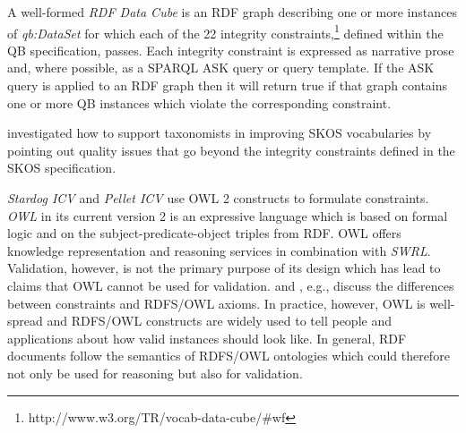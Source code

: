\documentclass[conference]{IEEEtran}
\begin{document}
A well-formed \emph{RDF Data Cube} is an RDF graph describing one or more instances of \emph{qb:DataSet} for which each of the 22 integrity constraints,\footnote{http://www.w3.org/TR/vocab-data-cube/\#wf} defined within the QB specification, passes.
Each integrity constraint is expressed as narrative prose and, where possible, as a SPARQL ASK query or query template. 
If the ASK query is applied to an RDF graph then it will return true if that graph contains one or more QB instances which violate the corresponding constraint.

\cite{MaderHaslhoferIsaac2012} investigated how to support
taxonomists in improving SKOS vocabularies by pointing out quality
issues that go beyond the integrity constraints defined in the SKOS specification.
 
\emph{Stardog ICV} and \emph{Pellet ICV} use OWL 2 constructs to formulate constraints. \emph{OWL} in its current version 2 is an expressive language which is based on formal logic and on the subject-predicate-object triples from RDF. OWL offers knowledge representation and reasoning services in combination with \emph{SWRL}. Validation, however, is not the primary purpose of its design which has lead to claims that OWL cannot be used for validation. \cite{Motik-2007} and \cite{Motik-2009}, e.g., discuss the differences between constraints and RDFS/OWL axioms. In practice, however, OWL is well-spread and RDFS/OWL constructs are widely used to tell people and applications about how valid instances should look like. In general, RDF documents follow the semantics of RDFS/OWL ontologies which could therefore not only be used for reasoning but also for validation. 
\end{document}
